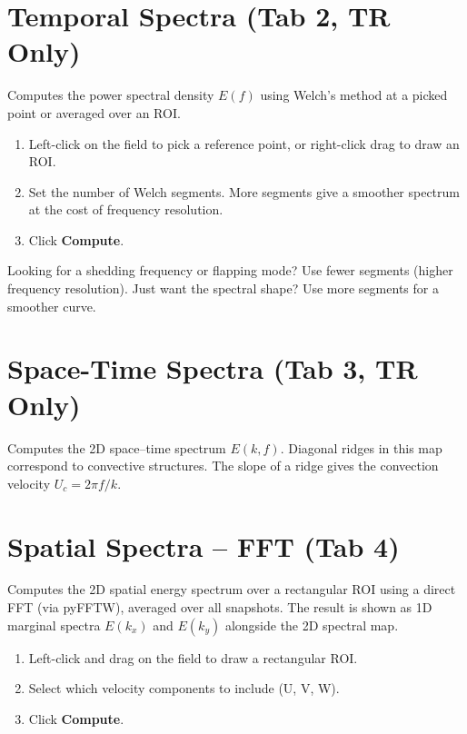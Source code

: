 \documentclass[11pt, a4paper]{report}
\newcommand{\uipth}[1]{\textbf{\textcolor{upblue}{#1}}}
\begin{document}
\section{Temporal Spectra (Tab 2, TR Only)}

Computes the power spectral density $E(f)$ using Welch's method at a picked point or averaged over an ROI.

\begin{stepbox}
\begin{enumerate}[leftmargin=1.5em, topsep=2pt]
  \item Left-click on the field to pick a reference point, or right-click drag to draw an ROI.
  \item Set the number of Welch segments. More segments give a smoother spectrum at the cost of frequency resolution.
  \item Click \uipth{Compute}.
\end{enumerate}
\end{stepbox}

\begin{tipbox}
Looking for a shedding frequency or flapping mode? Use fewer segments (higher frequency resolution). Just want the spectral shape? Use more segments for a smoother curve.
\end{tipbox}

\section{Space-Time Spectra (Tab 3, TR Only)}

Computes the 2D space--time spectrum $E(k, f)$. Diagonal ridges in this map correspond to convective structures. The slope of a ridge gives the convection velocity $U_c = 2\pi f / k$.

\section{Spatial Spectra -- FFT (Tab 4)}

Computes the 2D spatial energy spectrum over a rectangular ROI using a direct FFT (via pyFFTW), averaged over all snapshots. The result is shown as 1D marginal spectra $E(k_x)$ and $E(k_y)$ alongside the 2D spectral map.

\begin{stepbox}
\begin{enumerate}[leftmargin=1.5em, topsep=2pt]
  \item Left-click and drag on the field to draw a rectangular ROI.
  \item Select which velocity components to include (U, V, W).
  \item Click \uipth{Compute}.
\end{enumerate}
\end{stepbox}
\end{document}
